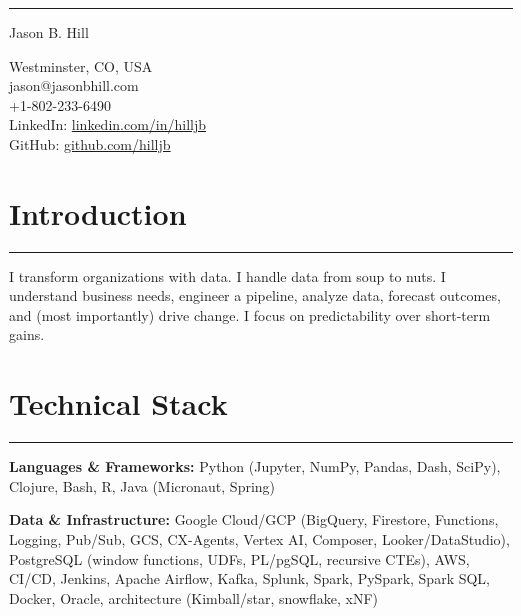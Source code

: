 \documentclass[letterpaper,10pt]{article}
\newcommand{\mblue}{\color{darkblue}}
\begin{document}
\pagestyle{empty}

{\mblue\rule{12.50cm}{0.08cm}}

\vspace{-1.0pc}
\hfill{\Huge\mblue Jason B. Hill}
\begin{flushright}\small
    Westminster, CO, USA \\
    jason@jasonbhill.com \\
    +1-802-233-6490 \\
    LinkedIn: \href{https://www.linkedin.com/in/hilljb}{linkedin.com/in/hilljb} \\
    GitHub: \href{https://github.com/hilljb}{github.com/hilljb}
\end{flushright}

\vspace{1pc}

\section*{\mblue Introduction}

\vspace{-2.15pc}
{\hfill\mblue\rule{5.63in}{0.02cm}}

\vspace{1pc}
I transform organizations with data. I handle data from soup to nuts. I understand business needs, engineer a pipeline, analyze data, forecast outcomes, and (most importantly) drive change. I focus on predictability over short-term gains.

\section*{\mblue Technical Stack}

\vspace{-2.15pc}
{\hfill\mblue\rule{5.39in}{0.02cm}}

\vspace{1pc}
\textbf{Languages \& Frameworks:} Python (Jupyter, NumPy, Pandas, Dash, SciPy), Clojure, Bash, R, Java (Micronaut, Spring)

\vspace{1pc}
\textbf{Data \& Infrastructure:} Google Cloud/GCP (BigQuery, Firestore, Functions, Logging, Pub/Sub, GCS, CX-Agents, Vertex AI, Composer, Looker/DataStudio), PostgreSQL (window functions, UDFs, PL/pgSQL, recursive CTEs), AWS, CI/CD, Jenkins, Apache Airflow, Kafka, Splunk, Spark, PySpark, Spark SQL, Docker, Oracle, architecture (Kimball/star, snowflake, xNF)
\end{document}
